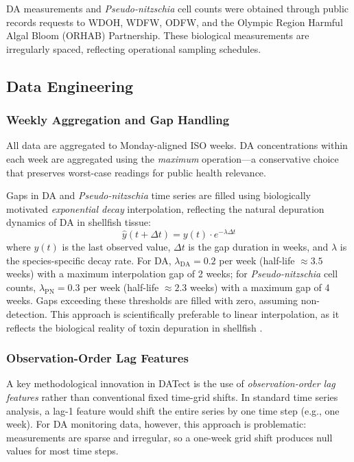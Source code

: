 \documentclass[preprint,12pt,authoryear]{elsarticle}
\begin{document}
DA measurements and \textit{Pseudo-nitzschia} cell counts were obtained through public records requests to WDOH, WDFW, ODFW, and the Olympic Region Harmful Algal Bloom (ORHAB) Partnership. These biological measurements are irregularly spaced, reflecting operational sampling schedules.

\subsection{Data Engineering}
\label{sec:data-engineering}

\subsubsection{Weekly Aggregation and Gap Handling}

All data are aggregated to Monday-aligned ISO weeks. DA concentrations within each week are aggregated using the \textit{maximum} operation---a conservative choice that preserves worst-case readings for public health relevance.

Gaps in DA and \textit{Pseudo-nitzschia} time series are filled using biologically motivated \textit{exponential decay} interpolation, reflecting the natural depuration dynamics of DA in shellfish tissue:
\begin{equation}
\hat{y}(t + \Delta t) = y(t) \cdot e^{-\lambda \Delta t}
\label{eq:decay}
\end{equation}
where $y(t)$ is the last observed value, $\Delta t$ is the gap duration in weeks, and $\lambda$ is the species-specific decay rate. For DA, $\lambda_{\text{DA}} = 0.2$ per week (half-life $\approx 3.5$ weeks) with a maximum interpolation gap of 2 weeks; for \textit{Pseudo-nitzschia} cell counts, $\lambda_{\text{PN}} = 0.3$ per week (half-life $\approx 2.3$ weeks) with a maximum gap of 4 weeks. Gaps exceeding these thresholds are filled with zero, assuming non-detection. This approach is scientifically preferable to linear interpolation, as it reflects the biological reality of toxin depuration in shellfish \citep{Drum1993, Wekell1994, Bricelj1998}.

\subsubsection{Observation-Order Lag Features}
\label{sec:obs-order-lags}

A key methodological innovation in DATect is the use of \textit{observation-order lag features} rather than conventional fixed time-grid shifts. In standard time series analysis, a lag-1 feature would shift the entire series by one time step (e.g., one week). For DA monitoring data, however, this approach is problematic: measurements are sparse and irregular, so a one-week grid shift produces null values for most time steps.
\end{document}
